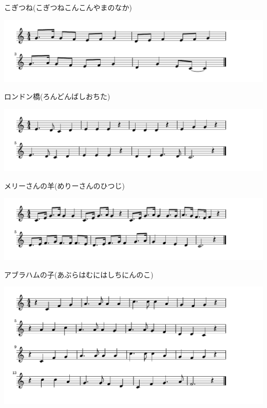\documentclass[a4paper]{ltjsarticle}
\begin{document}
\vspace{-10mm} \hspace{10mm}
こぎつね(こぎつねこんこんやまのなか)

\includegraphics[clip]{londonbashi_crop.pdf}

\vspace{-10mm} \hspace{10mm}
ロンドン橋(ろんどんばしおちた)

\includegraphics[clip]{marysanno_crop.pdf}

\vspace{-10mm} \hspace{10mm}
メリーさんの羊(めりーさんのひつじ)

\includegraphics[clip]{abrahamunoko_crop.pdf}

\vspace{-10mm} \hspace{10mm}
アブラハムの子(あぶらはむにはしちにんのこ)

\includegraphics[clip]{chatsumi_crop.pdf}
\end{document}
